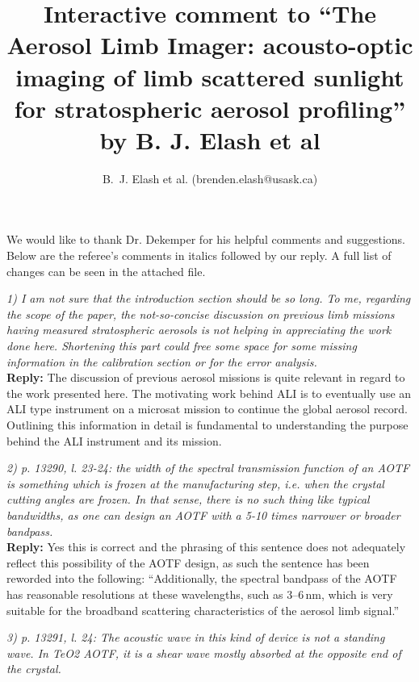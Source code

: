\documentclass[12pt, notitlepage]{article}
\title{Interactive comment to ``The Aerosol Limb Imager: acousto-optic imaging of limb scattered
sunlight for stratospheric aerosol profiling'' by B. J. Elash et al}
\author{B.~J. Elash et al. (brenden.elash@usask.ca)}
\begin{document}
\begin{titlepage}
\maketitle
\end{titlepage}


We would like to thank Dr. Dekemper for his helpful comments and suggestions. Below are the referee's comments in italics followed by our reply. A full list of changes can be seen in the attached file.

\hrulefill

\textit{1) I am not sure that the introduction section should be so long. To me, regarding the
scope of the paper, the not-so-concise discussion on previous limb missions having
measured stratospheric aerosols is not helping in appreciating the work done here.
Shortening this part could free some space for some missing information in the calibration
section or for the error analysis.}\\

\textbf{Reply:} The discussion of previous aerosol missions is quite relevant in regard to the work presented here. The motivating work behind ALI is to eventually use an ALI type instrument on a microsat mission to continue the global aerosol record. Outlining this information in detail is fundamental to understanding the purpose behind the ALI instrument and its mission.

\hrulefill

\textit{2) p. 13290, l. 23-24: the width of the spectral transmission function of an AOTF
is something which is frozen at the manufacturing step, i.e. when the crystal cutting
angles are frozen. In that sense, there is no such thing like typical bandwidths, as one
can design an AOTF with a 5-10 times narrower or broader bandpass.}\\

\textbf{Reply:} Yes this is correct and the phrasing of this sentence does not adequately reflect this possibility of the AOTF design, as such the sentence has been reworded into the following: ``Additionally, the spectral bandpass of the AOTF has reasonable resolutions at these wavelengths, such as 3--6\,nm, which is very suitable for the broadband scattering characteristics of the aerosol limb signal.''

\hrulefill

\textit{3) p. 13291, l. 24: The acoustic wave in this kind of device is not a standing wave. In
TeO2 AOTF, it is a shear wave mostly absorbed at the opposite end of the crystal.}\\
\end{document}
